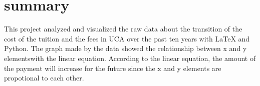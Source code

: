 \section{summary}
This project analyzed and visualized the raw data about the transition of the cost of the tuition and the fees in UCA over the past ten years with LaTeX and Python. The graph made by the data showed the relationship between x and y elementswith the linear equation. According to the linear equation, the amount of the payment will increase for the future since the x and y elements are propotional to each other.




